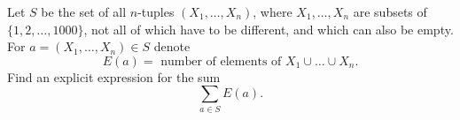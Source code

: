 Let $S$ be the set of all $n$-tuples $(X_1,\ldots,X_n)$, where $X_1,\ldots,X_n$ are subsets of
$\{1,2,\ldots,1000\}$, not all of which have to be different, and which can also be empty.
For $a = (X_1,\ldots,X_n) \in S$ denote
$$E(a) = \text{ number of elements of } X_1 \cup \ldots \cup X_n.$$
Find an explicit expression for the sum
$$\sum_{a \in S} E(a).$$
